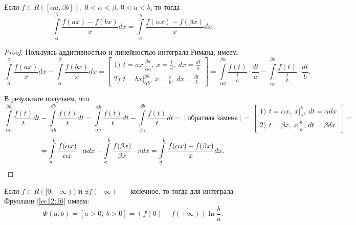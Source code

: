 \documentclass[../../main.tex]{subfiles}
\begin{document}
\begin{lem}[Фруллани]
Если $f \in R([\alpha a, \beta b]),\ 0 < \alpha < \beta,\ 0 < a < b$, то тогда 
\begin{equation}
\int\limits_\alpha^\beta \frac{f(ax) - f(bx)}x dx = \int\limits_a^b \frac{f(\alpha x) - f(\beta x)}x dx.
\label{lec12:17} 
\end{equation}
\end{lem}

\begin{proof}
Пользуясь аддитивностью и линейностью интеграла Римана, имеем: 
\[\int\limits_\alpha^\beta \frac{f(ax)}x dx - \int\limits_\alpha^\beta \frac{f(bx)}x dx = \left[
\begin{gathered}
1)\ \, t = ax\big|_{\alpha a}^{\beta a},\ x = \frac ta,\ dx = \frac{dt}a \\
2)\ \, t = bx\big|_{\alpha b}^{\beta b},\ x = \frac tb,\ dx = \frac{dt}b
\end{gathered}
\right] = \int\limits_{\alpha a}^{\beta a} \frac{f(t)}{\frac ta} \cdot \frac {dt}a - \int\limits_{\alpha b}^{\beta b} \frac{f(t)}{\frac tb} \cdot \frac {dt}b.\] 

В результате получаем, что
\[\int\limits_{\alpha a}^{\beta a} \dfrac{f(t)}t dt - \int\limits_{\alpha b}^{\beta b} \frac{f(t)}t dt = \int\limits_{\alpha a}^{\alpha b} \frac{f(t)}t dt - \int\limits_{\beta a}^{\beta b} \frac{f(t)}t dt = [\text{обратная замена}] = \left[
\begin{gathered}
1)\ \, t = \alpha x,\ x\big|_a^b,\ dt = \alpha dx \\
2)\ \, t = \beta x,\ x\big|_a^b,\ dt = \beta dx
\end{gathered}
\right] =\]
\[= \int\limits_a^b \frac{f(\alpha x)}{\alpha x} \cdot \alpha dx - \int\limits_a^b \frac{f(\beta x)}{\beta x} \cdot\beta dx = \int\limits_a^b \frac{f(\alpha x) - f(\beta x)}x dx. \qedhere\]
\end{proof}

\begin{thm}
Если $f \in R([0; +\infty))$ и $\exists f(+\infty)$~--- конечное, то тогда для интеграла Фруллани \eqref{lec12:16} имеем:
\begin{equation}
\Phi(a, b) = [a > 0,\ b > 0] = (f(0) - f(+\infty))\ln \frac ba. 
\label{lec12:18} 
\end{equation}
\end{thm}
\end{document}
